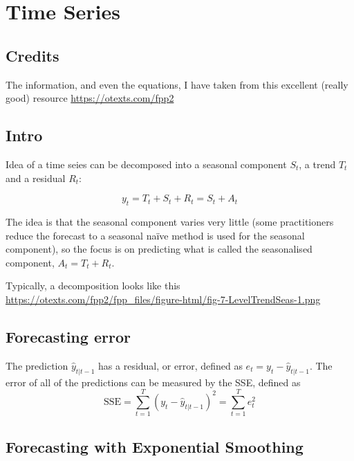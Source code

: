 \documentclass{article}
\begin{document}
\pagestyle{empty}

\section{Time Series}

\subsection{Credits}

The information, and even the equations, I have taken from this excellent (really good) resource \url{https://otexts.com/fpp2}

\subsection{Intro}

Idea of a time seies can be decomposed into a seasonal component $S_t$, a trend $T_t$ and a residual $R_t$:


\begin{equation}
  y_t = T_t + S_{t} + R_t = S_t + A_t
\label{eqn:basic_decomposition}
\end{equation}

The idea is that the seasonal component varies very little (some practitioners reduce the forecast to a seasonal na\"ive method is used for the seasonal component), so the focus is on predicting what is called the seasonalised component, $A_t = T_t  + R_t$.

Typically, a decomposition looks like this \url{https://otexts.com/fpp2/fpp_files/figure-html/fig-7-LevelTrendSeas-1.png}



\subsection{Forecasting error}

The prediction $\hat{y}_{t|t-1}$ has a residual, or error, defined as $e_t=y_t - \hat{y}_{t|t-1}$. The error of all of the predictions can be measured by the SSE, defined as 
\begin{equation}
 \text{SSE}=\sum_{t=1}^T(y_t - \hat{y}_{t|t-1})^2=\sum_{t=1}^Te_t^2
 \label{eqn:error_sse}
\end{equation}

\subsection{Forecasting with Exponential Smoothing}
\end{document}
